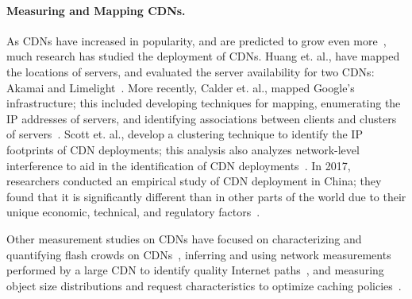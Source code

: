 \paragraph{Measuring and Mapping CDNs.} As CDNs have increased in popularity, and are predicted to grow even more~\cite{predict}, much research has 
studied the deployment of CDNs.  Huang et. al., have mapped the locations of servers, and evaluated the server availability for two CDNs: 
Akamai and Limelight~\cite{huang2008measuring}.  More recently, Calder et. al., mapped Google's infrastructure; this included 
developing techniques for mapping, enumerating the IP addresses of servers, and identifying associations between clients and clusters of 
servers~\cite{calder2013mapping}. Scott et. al., develop a clustering technique to identify the IP footprints of CDN deployments; this analysis
 also analyzes network-level interference to aid in the identification of CDN deployments~\cite{scott2016satellite}.  In 2017, researchers 
conducted an empirical study of CDN deployment in China; they found that it is significantly different than in other parts of the world 
due to their unique economic, technical, and regulatory factors~\cite{xue2017cdns}. 

Other measurement studies on CDNs have focused on characterizing and quantifying flash crowds on CDNs~\cite{wendell2011going}, inferring 
and using network measurements performed by a large CDN to identify quality Internet paths~\cite{su2009drafting}, and measuring object size distributions and 
request characteristics to optimize caching policies~\cite{berger2017adaptsize}.
